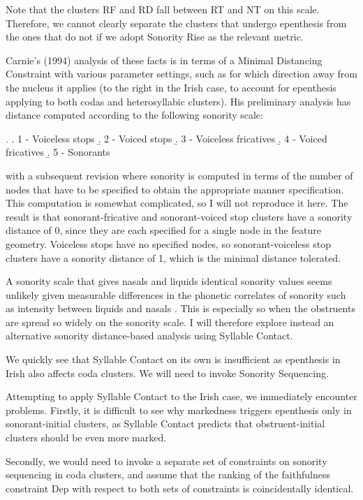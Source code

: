 \documentclass[12pt]{article}
\begin{document}
Note that the clusters RF and RD fall between RT and NT on this scale.  Therefore, we cannot clearly separate the clusters that undergo epenthesis
from the ones that do not if we adopt {\sc Sonority Rise} as the relevant metric.
        
\bigskip

Carnie's (1994) analysis of these facts is in terms of a Minimal Distancing Constraint with various parameter settings, such as for which direction away from the nucleus it applies (to the right in the Irish case, to account for epenthesis applying to both codas and heterosyllabic clusters). His preliminary analysis has distance computed according to the following sonority scale:

\ex. \label{carniesonorityscale} \a. 1 - Voiceless stops
     \b. 2 - Voiced stops
     \b. 3 - Voiceless fricatives
     \b. 4 - Voiced fricatives
     \b. 5 - Sonorants

with a subsequent revision where sonority is computed in terms of the number of nodes that have to be specified to obtain the appropriate manner specification. This computation is somewhat complicated, so I will not reproduce it here. The result is that sonorant-fricative and sonorant-voiced stop clusters have a sonority distance of 0, since they are each specified for a single node in the feature geometry. Voiceless stops have no specified nodes, so sonorant-voiceless stop clusters have a sonority distance of 1, which is the minimal distance tolerated. 

A sonority scale that gives nasals and liquids identical sonority values seems unlikely given measurable differences in the phonetic correlates of sonority such as intensity between liquids and nasals \citep{parker.2002}. This is especially so when the obstruents are spread so widely on the sonority scale. 
I will therefore explore instead an alternative sonority distance-based analysis using Syllable Contact.

\bigskip

We quickly see that Syllable Contact on its own is insufficient as epenthesis in Irish also affects coda clusters. We will need to invoke Sonority Sequencing. 

Attempting to apply Syllable Contact to the Irish case, we immediately encounter problems. Firstly, it is difficult to see why markedness triggers epenthesis only in sonorant-initial clusters, as Syllable Contact predicts that obstruent-initial clusters should be even more marked.

Secondly, we would need to invoke a separate set of constraints on sonority sequencing in coda clusters, and assume that the ranking of the faithfulness constraint {\sc Dep} with respect to both sets of constraints is coincidentally identical.
\end{document}
